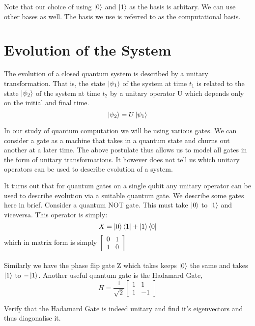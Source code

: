 Note that our choice of using $\ket{0}$ and $\ket{1}$ as the basis is arbitary. We can use other bases as well. The basis we use is referred to as the computational basis.

\section{Evolution of the System}
\begin{postulate}
The evolution of a closed quantum system is described by a unitary
transformation. That is, the state $\ket{\psi_1}$ of the system at time $t_1$ is related to the
state $\ket{\psi_2}$ of the system at time $t_2$ by a unitary operator U which depends only on the initial and final time.
$$\ket{\psi_2} = U\ket{\psi_1}$$
\end{postulate}

In our study of quantum computation we will be using various gates. We can consider a gate as a machine that takes in a quantum state and churns out another at a later time. The above postulate thus allows us to model all gates in the form of unitary transformations. It however does not tell us which unitary operators can be used to describe evolution of a system.

It turns out that for quantum gates on a single qubit any unitary operator can be used to describe evolution via a suitable quantum gate.
We describe some gates here in brief. Consider a quantum NOT gate. This must take $\ket{0}$ to $\ket{1}$ and viceversa. This operator is simply:
$$ X = \ket{0}\bra{1} + \ket{1}\bra{0}$$
which in matrix form is simply
$\begin{bmatrix}
0 & 1 \\ 1 & 0
\end{bmatrix}$ \\ \\ 
Similarly we have the phase flip gate Z which takes keeps $\ket{0}$ the same and takes $\ket{1}$ to $-\ket{1}$.
Another useful quantum gate is the Hadamard Gate,
$$ H = \frac{1}{\sqrt{2}}\begin{bmatrix} 1 & 1 \\ 1& -1 \end{bmatrix} $$

\begin{exercise}
Verify that the Hadamard Gate is indeed unitary and find it's eigenvectors and thus diagonalise it.
\end{exercise}

